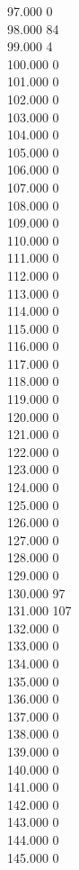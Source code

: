 { 97.000	0 \\
 98.000	84 \\
 99.000	4 \\
 100.000	0 \\
 101.000	0 \\
 102.000	0 \\
 103.000	0 \\
 104.000	0 \\
 105.000	0 \\
 106.000	0 \\
 107.000	0 \\
 108.000	0 \\
 109.000	0 \\
 110.000	0 \\
 111.000	0 \\
 112.000	0 \\
 113.000	0 \\
 114.000	0 \\
 115.000	0 \\
 116.000	0 \\
 117.000	0 \\
 118.000	0 \\
 119.000	0 \\
 120.000	0 \\
 121.000	0 \\
 122.000	0 \\
 123.000	0 \\
 124.000	0 \\
 125.000	0 \\
 126.000	0 \\
 127.000	0 \\
 128.000	0 \\
 129.000	0 \\
 130.000	97 \\
 131.000	107 \\
 132.000	0 \\
 133.000	0 \\
 134.000	0 \\
 135.000	0 \\
 136.000	0 \\
 137.000	0 \\
 138.000	0 \\
 139.000	0 \\
 140.000	0 \\
 141.000	0 \\
 142.000	0 \\
 143.000	0 \\
 144.000	0 \\
 145.000	0 \\
}
